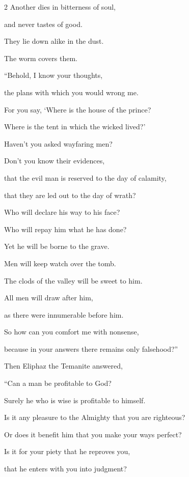 \begin{multicols}{2}
	\myverse{}Another dies in bitterness of soul,
	
	and never tastes of good.
	
	\myverse{}They lie down alike in the dust.
	
	The worm covers them.
	
	\vspace{\baselineskip}
	
	\myverse{}“Behold, I know your thoughts,
	
	the plans with which you would wrong me.
	
	\myverse{}For you say, ‘Where is the house of the prince?
	
	Where is the tent in which the wicked lived?’
	
	\myverse{}Haven’t you asked wayfaring men?
	
	Don’t you know their evidences,
	
	\myverse{}that the evil man is reserved to the day of calamity,
	
	that they are led out to the day of wrath?
	
	\myverse{}Who will declare his way to his face?
	
	Who will repay him what he has done?
	
	\myverse{}Yet he will be borne to the grave.
	
	Men will keep watch over the tomb.
	
	\myverse{}The clods of the valley will be sweet to him.
	
	All men will draw after him,
	
	as there were innumerable before him.
	
	\myverse{}So how can you comfort me with nonsense,
	
	because in your answers there remains only falsehood?”
	
	
	\mychapter{} \myverse*{}Then Eliphaz the Temanite answered,
	
	\quad\quad \myverse{}“Can a man be profitable to God?
	
	Surely he who is wise is profitable to himself.
	
	\myverse{}Is it any pleasure to the Almighty that you are righteous?
	
	Or does it benefit him that you make your ways perfect?
	
	\myverse{}Is it for your piety that he reproves you,
	
	that he enters with you into judgment?
	

\end{multicols}
